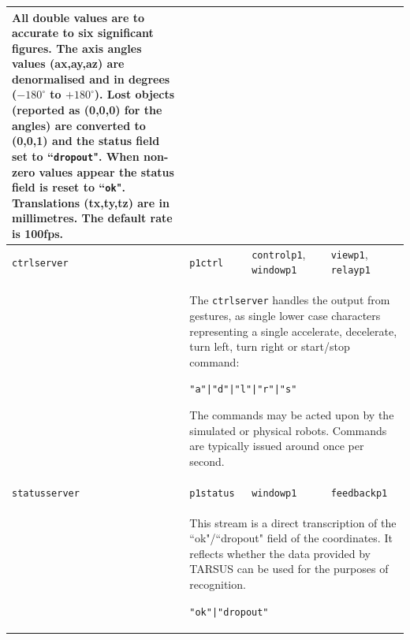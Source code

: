 \documentclass[12pt,a4,notitlepage]{report}
\renewcommand{\_}{\texttt{\symbol{95}}}
\newcommand{\<}{\texttt{\symbol{60}}}
\renewcommand{\>}{\texttt{\symbol{62}}}
\newcommand{\scopendpoint}[1]{\texttt{#1}}
\newcommand{\variable}[1]{\texttt{#1}}
\begin{document}
{\begin{tabular}{l|p{2.5cm}p{4.5cm}p{4.5cm}}
{\begin{minipage}{12.5cm}
All double values are to accurate to six significant figures.
The axis angles values (ax,ay,az) are denormalised and in degrees ($-180^{\circ}$ to $+180^{\circ} $). Lost objects (reported as (0,0,0) for the angles) are converted to (0,0,1) and the status field set to ``\variable{dropout}". When non-zero values appear the status field is reset to 
``\variable{ok}". Translations (tx,ty,tz) are in millimetres. The default rate is 100fps.\rule[-2mm]{0mm}{3mm}
\end{minipage}}\\

\hline
\rule{0mm}{4.5mm}\variable{ctrlserver} & \scopendpoint{p1ctrl} &
\scopendpoint{controlp1}, \scopendpoint{windowp1} &
\scopendpoint{viewp1}, \scopendpoint{relayp1}\rule[-2mm]{0mm}{3mm}\\

 & \multicolumn{3}{l}{\begin{minipage}{12.5cm}%
The \variable{ctrlserver} handles the output from gestures, as single lower case characters representing a single accelerate, decelerate, turn left, turn right or start/stop command:

\texttt{\<"a"|"d"|"l"|"r"|"s"\>}

The commands may be acted upon by the simulated or physical robots. Commands are typically issued around once per second.\rule[-2mm]{0mm}{3mm}
\end{minipage}}\\

\hline
\rule{0mm}{4.5mm}\variable{statusserver} & \scopendpoint{p1status} &
\scopendpoint{windowp1} & \scopendpoint{feedbackp1}\rule[-2mm]{0mm}{3mm}\\

 & \multicolumn{3}{l}{\begin{minipage}{12.5cm}%
This stream is a direct transcription of the ``ok"/``dropout" field of the coordinates. It reflects whether the data provided by TARSUS can be used for the purposes of recognition.

\texttt{\<"ok"|"dropout"\>}
\end{minipage}}\\
\end{tabular}

}
\end{document}
